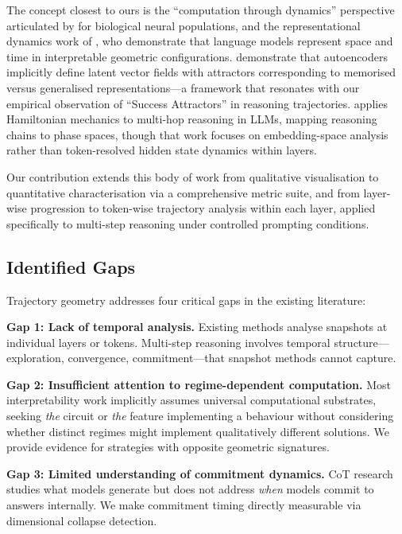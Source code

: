 \documentclass[11pt,twocolumn]{article}
\begin{document}
The concept closest to ours is the ``computation through dynamics'' perspective articulated by \citet{vyas2020computation} for biological neural populations, and the representational dynamics work of \citet{gurnee2023finding}, who demonstrate that language models represent space and time in interpretable geometric configurations. \citet{fumero2025latent} demonstrate that autoencoders implicitly define latent vector fields with attractors corresponding to memorised versus generalised representations---a framework that resonates with our empirical observation of ``Success Attractors'' in reasoning trajectories. \citet{marin2024hamiltonian} applies Hamiltonian mechanics to multi-hop reasoning in LLMs, mapping reasoning chains to phase spaces, though that work focuses on embedding-space analysis rather than token-resolved hidden state dynamics within layers.

Our contribution extends this body of work from qualitative visualisation to quantitative characterisation via a comprehensive metric suite, and from layer-wise progression to token-wise trajectory analysis within each layer, applied specifically to multi-step reasoning under controlled prompting conditions.

\subsection{Identified Gaps}

Trajectory geometry addresses four critical gaps in the existing literature:

\textbf{Gap 1: Lack of temporal analysis.} Existing methods analyse snapshots at individual layers or tokens. Multi-step reasoning involves temporal structure---exploration, convergence, commitment---that snapshot methods cannot capture.

\textbf{Gap 2: Insufficient attention to regime-dependent computation.} Most interpretability work implicitly assumes universal computational substrates, seeking \emph{the} circuit or \emph{the} feature implementing a behaviour without considering whether distinct regimes might implement qualitatively different solutions. We provide evidence for strategies with opposite geometric signatures.

\textbf{Gap 3: Limited understanding of commitment dynamics.} CoT research studies what models generate but does not address \emph{when} models commit to answers internally. We make commitment timing directly measurable via dimensional collapse detection.
\end{document}
